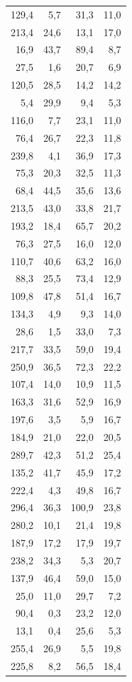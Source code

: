 \documentclass[
  letterpaper,
  DIV=11,
  numbers=noendperiod]{scrreprt}
\begin{document}
\begin{longtable*}{rrrr}
129,4 & 5,7 & 31,3 & 11,0 \\ 
213,4 & 24,6 & 13,1 & 17,0 \\ 
16,9 & 43,7 & 89,4 & 8,7 \\ 
27,5 & 1,6 & 20,7 & 6,9 \\ 
120,5 & 28,5 & 14,2 & 14,2 \\ 
5,4 & 29,9 & 9,4 & 5,3 \\ 
116,0 & 7,7 & 23,1 & 11,0 \\ 
76,4 & 26,7 & 22,3 & 11,8 \\ 
239,8 & 4,1 & 36,9 & 17,3 \\ 
75,3 & 20,3 & 32,5 & 11,3 \\ 
68,4 & 44,5 & 35,6 & 13,6 \\ 
213,5 & 43,0 & 33,8 & 21,7 \\ 
193,2 & 18,4 & 65,7 & 20,2 \\ 
76,3 & 27,5 & 16,0 & 12,0 \\ 
110,7 & 40,6 & 63,2 & 16,0 \\ 
88,3 & 25,5 & 73,4 & 12,9 \\ 
109,8 & 47,8 & 51,4 & 16,7 \\ 
134,3 & 4,9 & 9,3 & 14,0 \\ 
28,6 & 1,5 & 33,0 & 7,3 \\ 
217,7 & 33,5 & 59,0 & 19,4 \\ 
250,9 & 36,5 & 72,3 & 22,2 \\ 
107,4 & 14,0 & 10,9 & 11,5 \\ 
163,3 & 31,6 & 52,9 & 16,9 \\ 
197,6 & 3,5 & 5,9 & 16,7 \\ 
184,9 & 21,0 & 22,0 & 20,5 \\ 
289,7 & 42,3 & 51,2 & 25,4 \\ 
135,2 & 41,7 & 45,9 & 17,2 \\ 
222,4 & 4,3 & 49,8 & 16,7 \\ 
296,4 & 36,3 & 100,9 & 23,8 \\ 
280,2 & 10,1 & 21,4 & 19,8 \\ 
187,9 & 17,2 & 17,9 & 19,7 \\ 
238,2 & 34,3 & 5,3 & 20,7 \\ 
137,9 & 46,4 & 59,0 & 15,0 \\ 
25,0 & 11,0 & 29,7 & 7,2 \\ 
90,4 & 0,3 & 23,2 & 12,0 \\ 
13,1 & 0,4 & 25,6 & 5,3 \\ 
255,4 & 26,9 & 5,5 & 19,8 \\ 
225,8 & 8,2 & 56,5 & 18,4 \\ 

\end{longtable*}
\end{document}
